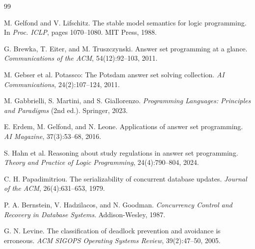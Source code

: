 \documentclass[a4paper,11pt]{article}
\begin{document}
\begin{thebibliography}{99}

M. Gelfond and V. Lifschitz.
The stable model semantics for logic programming.
In \textit{Proc. ICLP}, pages 1070--1080. MIT Press, 1988.

G. Brewka, T. Eiter, and M. Truszczynski.
Answer set programming at a glance.
\textit{Communications of the ACM}, 54(12):92--103, 2011.

M. Gebser et al.
Potassco: The Potsdam answer set solving collection.
\textit{AI Communications}, 24(2):107--124, 2011.

M. Gabbrielli, S. Martini, and S. Giallorenzo.
\textit{Programming Languages: Principles and Paradigms} (2nd ed.).
Springer, 2023.

E. Erdem, M. Gelfond, and N. Leone.
Applications of answer set programming.
\textit{AI Magazine}, 37(3):53--68, 2016.

S. Hahn et al.
Reasoning about study regulations in answer set programming.
\textit{Theory and Practice of Logic Programming}, 24(4):790--804, 2024.

C. H. Papadimitriou.
The serializability of concurrent database updates.
\textit{Journal of the ACM}, 26(4):631--653, 1979.

P. A. Bernstein, V. Hadzilacos, and N. Goodman.
\textit{Concurrency Control and Recovery in Database Systems}.
Addison-Wesley, 1987.

G. N. Levine.
The classification of deadlock prevention and avoidance is erroneous.
\textit{ACM SIGOPS Operating Systems Review}, 39(2):47--50, 2005.

\end{thebibliography}
\end{document}
